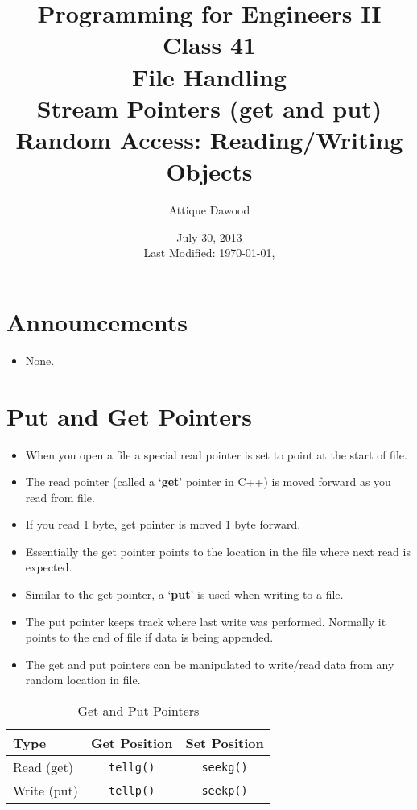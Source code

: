 \documentclass[12pt,a4paper]{article}
\title{\vspace{-2cm}Programming for Engineers II\\Class 41\\File Handling\\Stream Pointers (get and put)\\Random Access: Reading/Writing Objects}
\author{Attique Dawood}
\date{July 30, 2013\\[0.2cm] Last Modified: \today, \currenttime}
\begin{document}
\maketitle
\section{Announcements}
\begin{itemize}
\item None.
\end{itemize}
\section{Put and Get Pointers}
\begin{itemize}
\item When you open a file a special read pointer is set to point at the start of file.
\item The read pointer (called a `\textbf{get}' pointer in C++) is moved forward as you read from file.
\item If you read 1 byte, get pointer is moved 1 byte forward.
\item Essentially the get pointer points to the location in the file where next read is expected.
\item Similar to the get pointer, a `\textbf{put}' is used when writing to a file.
\item The put pointer keeps track where last write was performed. Normally it points to the end of file if data is being appended.
\item The get and put pointers can be manipulated to write/read data from any random location in file.
\end{itemize}
\begin{table}[H]
\begin{center}
\vspace{0.3cm}
	\begin{tabular}{lcc}
	\hline \hline
		\textbf{Type} \rule{0pt}{2.6ex} & \textbf{Get Position} & \textbf{Set Position}\\
		\hline
		Read (get)\rule{0pt}{2.6ex} &  \verb|tellg()| & \verb|seekg()|\\
		Write (put)\rule{0pt}{2.6ex} & \verb|tellp()| & \verb|seekp()|\\
	\hline \hline
	\end{tabular}
\end{center}
\label{GetandPutPointers}
\caption{Get and Put Pointers}
\end{table}
\end{document}
